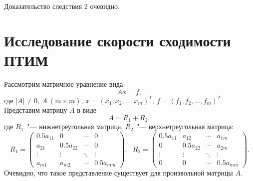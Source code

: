 \documentclass[11pt,a4paper,twoside,listtotoc,bibtotoc]{report}
\numberwithin{equation}{section}
\theoremstyle{definition}
\theoremstyle{plain}
\begin{document}
Доказательство следствия 2 очевидно.
%
\section{Исследование скорости сходимости {\scshape ПТИМ}}
%
Рассмотрим матричное уравнение вида
%
\begin{equation}
    \label{eq:linear-system5}
    Ax = f,
\end{equation}
%
где
$
|A| \ne 0, ~A~(m \times m),~
x = (x_1, x_2, \ldots, x_m)^T,~
f = (f_1, f_2, \ldots, f_m)^T
$.
\\
Представим матрицу $A$ в виде
%
$$
    A = R_1 + R_2,
$$
%
где $R_1$~"--- нижнетреугольная матрица, $R_2$~"--- верхнетреугольная матрица:
%
$$
    R_1 =
    \begin{pmatrix}
        0.5a_{11}& 0        & \cdots & 0  \\
        a_{21}   & 0.5a_{22}& \cdots & 0  \\
        \vdots   & \vdots   & \ddots & \vdots  \\
        a_{m1}   & a_{m2}   & \cdots & 0.5a_{mm}
    \end{pmatrix}
    ,
    ~~~R_2 =
    \begin{pmatrix}
        0.5a_{11}& a_{12}   & \cdots & a_{1m} \\
        0        & 0.5a_{22}& \cdots & a_{2m} \\
        \vdots   & \vdots   & \ddots & \vdots \\
        0        & 0        & \cdots & 0.5a_{mm}
    \end{pmatrix}
    .
$$
%
Очевидно, что такое представление существует для произвольной матрицы $A$.
\end{document}
